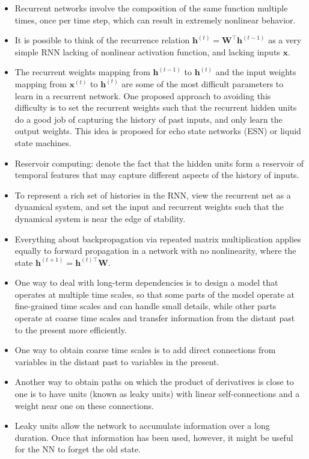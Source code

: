 \documentclass{article}
\begin{document}
\begin{itemize}
\item Recurrent networks involve the composition of the same function multiple times, once per time step, which can result in extremely nonlinear behavior.
\item It is possible to think of the recurrence relation \(\boldsymbol{h}^{(t)} = \boldsymbol{W}^{\top}\boldsymbol{h}^{(t-1)}\) as a very simple RNN lacking of nonlinear activation function, and lacking inputs \(\boldsymbol{x}\).
\item The recurrent weights mapping from \(\boldsymbol{h}^{(t-1)}\) to \(\boldsymbol{h}^{(t)}\) and the input weights mapping from \(\boldsymbol{x}^{(t)}\) to \(\boldsymbol{h}^{(t)}\) are some of the most difficult parameters to learn in a recurrent network. One proposed approach to avoiding this difficulty is to set the recurrent weights such that the recurrent hidden units do a good job of capturing the history of past inputs, and only learn the output weights. This idea is proposed for echo state networks (ESN) or liquid state machines.
\item Reservoir computing: denote the fact that the hidden units form a reservoir of temporal features that may capture different aspects of the history of inputs.
\item To represent a rich set of histories in the RNN, view the recurrent net as a dynamical system, and set the input and recurrent weights such that the dynamical system is near the edge of stability.
\item Everything about backpropagation via repeated matrix multiplication applies equally to forward propagation in a network with no nonlinearity, where the state \(\boldsymbol{h}^{(t+1)} = \boldsymbol{h}^{(t)\top}\boldsymbol{W}\).
\item One way to deal with long-term dependencies is to design a model that operates at multiple time scales, so that some parts of the model operate at fine-grained time scales and can handle small details, while other parts operate at coarse time scales and transfer information from the distant past to the present more efficiently.
\item One way to obtain coarse time scales is to add direct connections from variables in the distant past to variables in the present.
\item Another way to obtain paths on which the product of derivatives is close to one is to have units (known as leaky units) with linear self-connections and a weight near one on these connections.
\item Leaky units allow the network to accumulate information over a long duration. Once that information has been used, however, it might be useful for the NN to forget the old state.

\end{itemize}
\end{document}
